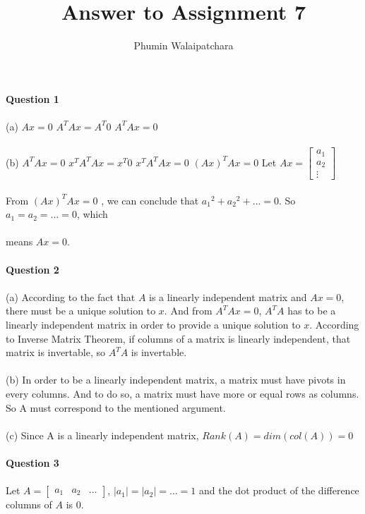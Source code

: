 \documentclass{article}
\begin{document}
\title{Answer to Assignment 7}
\author{Phumin Walaipatchara}
\date{}
\maketitle
\noindent\textbf{Question 1}
\\\\
\indent(a)
\indent
$Ax = 0$
\indent
$A^TAx = A^T0$
\indent
$A^TAx = 0$
\\\\
\indent(b)
\indent
$A^TAx = 0$
\indent
$x^TA^TAx = x^T0$
\indent
$x^TA^TAx = 0$
\indent
$(Ax)^TAx = 0$ 
\indent
Let
$
Ax = \begin{bmatrix}a_1\\a_2\\\vdots\end{bmatrix}
$
\\\\
\indent\indent\indent
From $(Ax)^TAx = 0$ , we can conclude that ${a_1}^2 + {a_2}^2 + \hdots = 0$. So $a_1 = a_2 = \hdots = 0$, which
\\\\
\indent\indent\indent
means $Ax = 0$.
\\\\
\noindent\textbf{Question 2}
\\\\
\indent(a)
According to the fact that $A$ is a linearly independent matrix and $Ax = 0$, there must be a unique solution to $x$. And from $A^TAx = 0$, $A^TA$ has to be a linearly independent matrix in order to provide a unique solution to $x$. According to Inverse Matrix Theorem, if columns of a matrix is linearly independent, that matrix is invertable, so $A^TA$ is invertable.
\\\\
\indent(b)
In order to be a linearly independent matrix, a matrix must have pivots in every columns. And to do so, a matrix must have more or equal  rows as columns. So A must correspond to the mentioned argument.
\\\\
\indent(c)
Since A is a linearly independent matrix, $Rank(A) = dim(col(A)) = 0$
\\\\
\noindent\textbf{Question 3}
\\\\
Let $A = \begin{bmatrix}a_1&a_2&\hdots\end{bmatrix}$, $|a_1| = |a_2| = \hdots = 1$ and the dot product of the difference columns of $A$ is $0$. 
\end{document}
